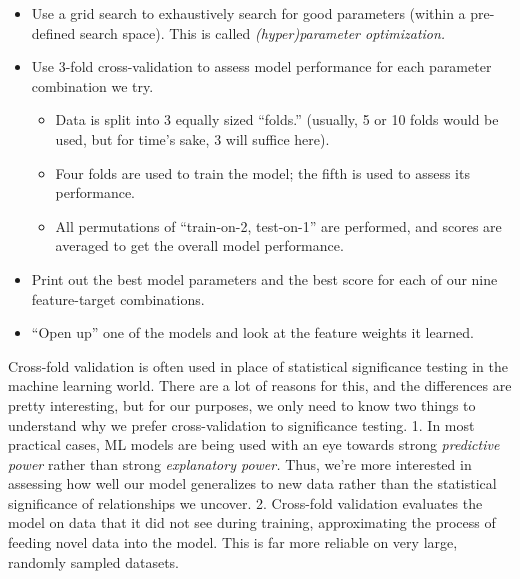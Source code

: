 \documentclass[11pt]{article}
\providecommand{\tightlist}{%
      \setlength{\itemsep}{0pt}\setlength{\parskip}{0pt}}
\begin{document}
\begin{itemize}
\tightlist
\item
  Use a grid search to exhaustively search for good parameters (within a
  pre-defined search space). This is called \emph{(hyper)parameter
  optimization.}
\item
  Use 3-fold cross-validation to assess model performance for each
  parameter combination we try.

  \begin{itemize}
  \tightlist
  \item
    Data is split into 3 equally sized ``folds.'' (usually, 5 or 10
    folds would be used, but for time's sake, 3 will suffice here).
  \item
    Four folds are used to train the model; the fifth is used to assess
    its performance.
  \item
    All permutations of ``train-on-2, test-on-1'' are performed, and
    scores are averaged to get the overall model performance.
  \end{itemize}
\item
  Print out the best model parameters and the best score for each of our
  nine feature-target combinations.
\item
  ``Open up'' one of the models and look at the feature weights it
  learned.
\end{itemize}

Cross-fold validation is often used in place of statistical significance
testing in the machine learning world. There are a lot of reasons for
this, and the differences are pretty interesting, but for our purposes,
we only need to know two things to understand why we prefer
cross-validation to significance testing. 1. In most practical cases, ML
models are being used with an eye towards strong \emph{predictive power}
rather than strong \emph{explanatory power.} Thus, we're more interested
in assessing how well our model generalizes to new data rather than the
statistical significance of relationships we uncover. 2. Cross-fold
validation evaluates the model on data that it did not see during
training, approximating the process of feeding novel data into the
model. This is far more reliable on very large, randomly sampled
datasets.
\end{document}

